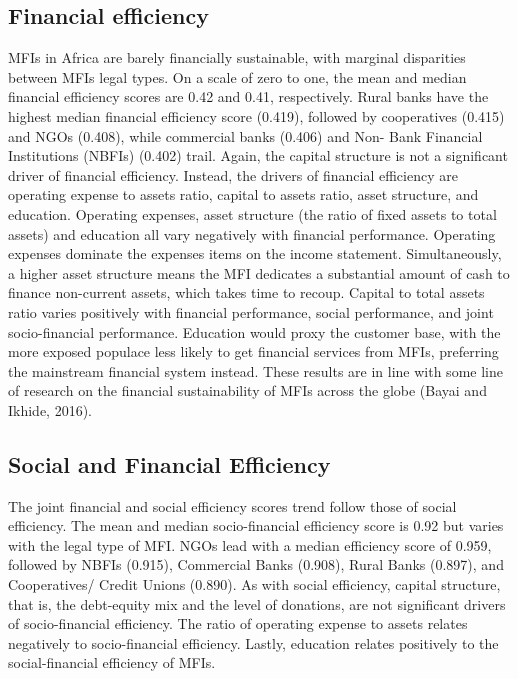 \documentclass[
]{article}
\begin{document}
\hypertarget{financial-efficiency}{%
\subsection{Financial efficiency}\label{financial-efficiency}}

MFIs in Africa are barely financially sustainable, with marginal
disparities between MFIs legal types. On a scale of zero to one, the
mean and median financial efficiency scores are 0.42 and 0.41,
respectively. Rural banks have the highest median financial efficiency
score (0.419), followed by cooperatives (0.415) and NGOs (0.408), while
commercial banks (0.406) and Non- Bank Financial Institutions (NBFIs)
(0.402) trail. Again, the capital structure is not a significant driver
of financial efficiency. Instead, the drivers of financial efficiency
are operating expense to assets ratio, capital to assets ratio, asset
structure, and education. Operating expenses, asset structure (the ratio
of fixed assets to total assets) and education all vary negatively with
financial performance. Operating expenses dominate the expenses items on
the income statement. Simultaneously, a higher asset structure means the
MFI dedicates a substantial amount of cash to finance non-current
assets, which takes time to recoup. Capital to total assets ratio varies
positively with financial performance, social performance, and joint
socio-financial performance. Education would proxy the customer base,
with the more exposed populace less likely to get financial services
from MFIs, preferring the mainstream financial system instead. These
results are in line with some line of research on the financial
sustainability of MFIs across the globe (Bayai and Ikhide, 2016).

\hypertarget{social-and-financial-efficiency}{%
\subsection{Social and Financial
Efficiency}\label{social-and-financial-efficiency}}

The joint financial and social efficiency scores trend follow those of
social efficiency. The mean and median socio-financial efficiency score
is 0.92 but varies with the legal type of MFI. NGOs lead with a median
efficiency score of 0.959, followed by NBFIs (0.915), Commercial Banks
(0.908), Rural Banks (0.897), and Cooperatives/ Credit Unions (0.890).
As with social efficiency, capital structure, that is, the debt-equity
mix and the level of donations, are not significant drivers of
socio-financial efficiency. The ratio of operating expense to assets
relates negatively to socio-financial efficiency. Lastly, education
relates positively to the social-financial efficiency of MFIs.
\end{document}
